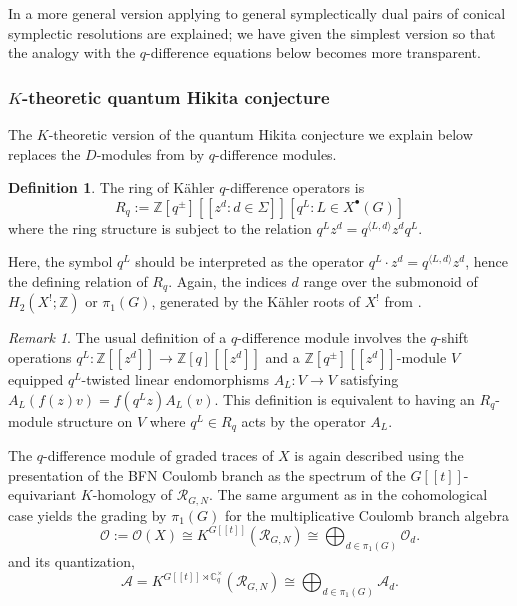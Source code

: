 \documentclass[reqno]{amsart}
\numberwithin{equation}{section}
\numberwithin{equation}{section}
\numberwithin{equation}{section}
\theoremstyle{definition}
\newtheorem{defn}[thm]{Definition}
\theoremstyle{remark}
\theoremstyle{remark}
\newtheorem{rem}[thm]{Remark}
\begin{document}
In \cite{KMP21, bai-lee} a more general version applying to general symplectically dual pairs of conical symplectic resolutions are explained; we have given the simplest version so that the analogy with the $q$-difference equations below becomes more transparent.


\subsubsection{$K$-theoretic quantum Hikita conjecture}

The $K$-theoretic version of the quantum Hikita conjecture we explain below replaces the $D$-modules from \cite{KMP21} by $q$-difference modules. 

\begin{defn}
    The ring of K\"ahler $q$-difference operators is
    \begin{equation}
        R_q := \mathbb{Z}[q^\pm][\![z^d: d \in \Sigma]\!][q^L : L \in X^\bullet (G) ]
    \end{equation}
    where the ring structure is subject to the relation $q^L z^d  = q^{\langle L, d \rangle } z^d q^L$.
\end{defn}
Here, the symbol $q^L$ should be interpreted as the operator $q^L \cdot z^d = q^{\langle L, d \rangle}z^d$, hence the defining relation of $R_q$. Again, the indices $d$ range over the submonoid of $H_2(X^!;\mathbb{Z})$ or $\pi_1(G)$, generated by the K\"ahler roots of $X^!$ from  \cite[Definition 2.21]{bai-lee}.

\begin{rem}
    The usual definition of a $q$-difference module involves the $q$-shift operations $q^L : \mathbb{Z}[\![z^d ]\!] \to \mathbb{Z}[q][\![z^d]\!]$ and a $\mathbb{Z}[q^\pm][\![z^d]\!]$-module $V$ equipped $q^L$-twisted linear endomorphisms $A_L : V \to V$ satisfying $A_L(f(z)v) = f(q^L z) A_L(v)$. This definition is equivalent to having an $R_q$-module structure on $V$ where $q^L \in R_q$ acts by the operator $A_L$.
\end{rem}

The $q$-difference module of graded traces of $X$ is again described using the presentation of the BFN Coulomb branch as the spectrum of the $G[\![t]\!]$-equivariant $K$-homology of $\mathcal{R}_{G, N}$. The same argument as in the cohomological case yields the grading by $\pi_1(G)$ for the multiplicative  Coulomb branch algebra
\begin{equation}
\mathcal{O}:=   \mathcal{O}(X) \cong K^{G[\![t]\!]} (\mathcal{R}_{G, N}) \cong \bigoplus_{d \in \pi_1(G)} \mathcal{O}_d.
\end{equation}
and its quantization,
\begin{equation}
    \mathcal{A}=  K^{G[\![t]\!] \rtimes \mathbb{C}^\times_q} (\mathcal{R}_{G, N}) \cong \bigoplus_{d \in \pi_1(G)} \mathcal{A}_d.
\end{equation}
\end{document}
